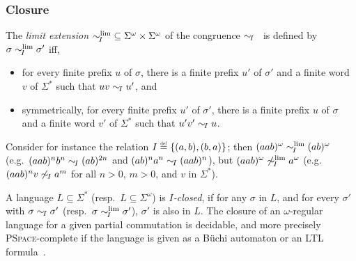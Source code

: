 \documentclass[11pt,reqno,a4paper]{amsart}
\newcommand{\eqdef}{\stackrel{\raisebox{-.15ex}{\scalebox{.5}{\upshape\textrm{def}}}}{=}}
\theoremstyle{plain}
\theoremstyle{definition}
\theoremstyle{remark}
\renewcommand{\paragraph}{\subsubsection*}
\begin{document}
\paragraph{Closure}
The \emph{limit extension}
$\mathrel{\sim_{\!I}^\mathrm{lim}}\;\subseteq\Sigma^\omega\times\Sigma^\omega$ of the congruence
$\mathrel{\sim_{\!I}}$~\citep{regtraces,omcl} is defined by $\sigma\mathrel{\sim_{\!I}^\mathrm{lim}}\sigma'$ iff,
\begin{itemize}
\item for every finite prefix $u$ of $\sigma$, there is a finite prefix
  $u'$ of $\sigma'$ and a finite word $v$ of $\Sigma^\ast$ such that
  $uv\mathrel{\sim_{\!I}} u'$, and
\item symmetrically, for every finite prefix $u'$ of $\sigma'$, there is
  a finite prefix $u$ of $\sigma$ and a finite word $v'$ of
  $\Sigma^\ast$ such that $u'v'\mathrel{\sim_{\!I}} u$.
\end{itemize}
Consider for instance the relation $I\eqdef\{(a,b),(b,a)\}$; then
$(aab)^\omega\mathrel{\sim_{\!I}^\mathrm{lim}}(ab)^\omega$ (e.g.\ $(aab)^nb^n\mathrel{\sim_{\!I}}(ab)^{2n}$
and $(ab)^na^n\mathrel{\sim_{\!I}}(aab)^n$), but $(aab)^\omega\not\mathrel{\sim_{\!I}^\mathrm{lim}} a^\omega$ (e.g.\ 
$(aab)^n v\not\mathrel{\sim_{\!I}} a^m$ for all $n>0$, $m>0$, and $v$
in $\Sigma^\ast$).

A language $L\subseteq\Sigma^\ast$ (resp.\ $L\subseteq\Sigma^\omega$)
is \emph{$I$-closed}, if for any $\sigma$ in $L$, and for every
$\sigma'$ with $\sigma\mathrel{\sim_{\!I}}\sigma'$ (resp.\ $\sigma\mathrel{\sim_{\!I}^\mathrm{lim}}\sigma'$),
$\sigma'$ is also in $L$.
The closure of an $\omega$-regular language for a given partial
commutation is decidable, and more precisely \textsc{PSpace}-complete if
the language is given as a B\"uchi automaton or an LTL
formula~\citep{omcl}.
\end{document}
